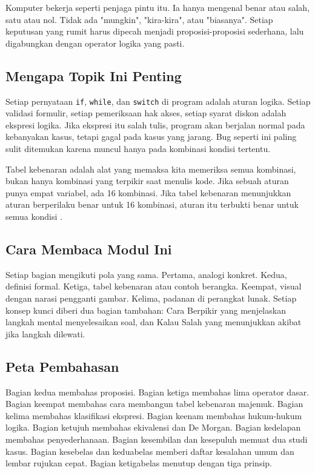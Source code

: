 \documentclass[11pt,a4paper]{article}
\begin{document}
Komputer bekerja seperti penjaga pintu itu. Ia hanya mengenal benar atau salah, satu atau nol. Tidak ada "mungkin", "kira-kira", atau "biasanya". Setiap keputusan yang rumit harus dipecah menjadi proposisi-proposisi sederhana, lalu digabungkan dengan operator logika yang pasti.

\subsection{Mengapa Topik Ini Penting}

Setiap pernyataan \texttt{if}, \texttt{while}, dan \texttt{switch} di program adalah aturan logika. Setiap validasi formulir, setiap pemeriksaan hak akses, setiap syarat diskon adalah ekspresi logika. Jika ekspresi itu salah tulis, program akan berjalan normal pada kebanyakan kasus, tetapi gagal pada kasus yang jarang. Bug seperti ini paling sulit ditemukan karena muncul hanya pada kombinasi kondisi tertentu.

Tabel kebenaran adalah alat yang memaksa kita memeriksa semua kombinasi, bukan hanya kombinasi yang terpikir saat menulis kode. Jika sebuah aturan punya empat variabel, ada 16 kombinasi. Jika tabel kebenaran menunjukkan aturan berperilaku benar untuk 16 kombinasi, aturan itu terbukti benar untuk semua kondisi \cite{rosen}.

\subsection{Cara Membaca Modul Ini}

Setiap bagian mengikuti pola yang sama. Pertama, analogi konkret. Kedua, definisi formal. Ketiga, tabel kebenaran atau contoh berangka. Keempat, visual dengan narasi pengganti gambar. Kelima, padanan di perangkat lunak. Setiap konsep kunci diberi dua bagian tambahan: Cara Berpikir yang menjelaskan langkah mental menyelesaikan soal, dan Kalau Salah yang menunjukkan akibat jika langkah dilewati.

\subsection{Peta Pembahasan}

Bagian kedua membahas proposisi. Bagian ketiga membahas lima operator dasar. Bagian keempat membahas cara membangun tabel kebenaran majemuk. Bagian kelima membahas klasifikasi ekspresi. Bagian keenam membahas hukum-hukum logika. Bagian ketujuh membahas ekivalensi dan De Morgan. Bagian kedelapan membahas penyederhanaan. Bagian kesembilan dan kesepuluh memuat dua studi kasus. Bagian kesebelas dan keduabelas memberi daftar kesalahan umum dan lembar rujukan cepat. Bagian ketigabelas menutup dengan tiga prinsip.
\end{document}
